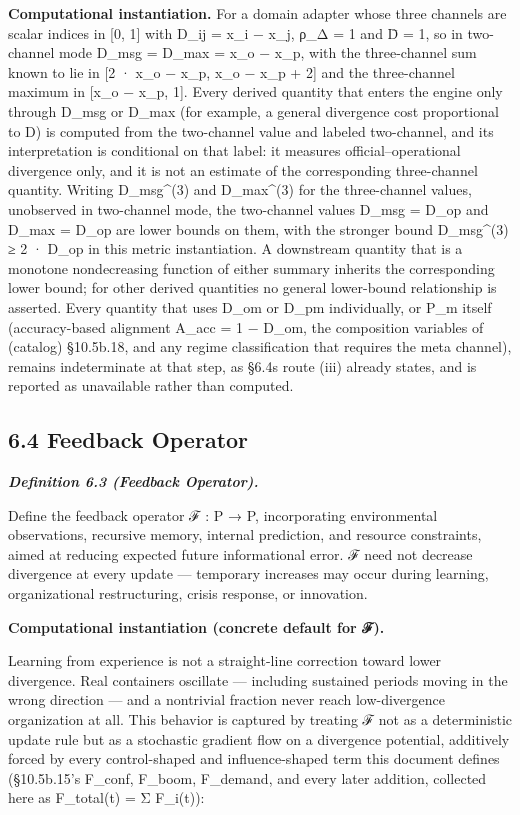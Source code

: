 \documentclass[
]{article}
\begin{document}
\textbf{Computational instantiation.} For a domain adapter whose three
channels are scalar indices in {[}0, 1{]} with D\_ij = \textbar x\_i −
x\_j\textbar, ρ\_Δ = 1 and D̄ = 1, so in two-channel mode D\_msg = D\_max
= \textbar x\_o − x\_p\textbar, with the three-channel sum known to lie
in {[}2 · \textbar x\_o − x\_p\textbar, \textbar x\_o − x\_p\textbar{} +
2{]} and the three-channel maximum in {[}\textbar x\_o − x\_p\textbar,
1{]}. Every derived quantity that enters the engine only through D\_msg
or D\_max (for example, a general divergence cost proportional to D) is
computed from the two-channel value and labeled two-channel, and its
interpretation is conditional on that label: it measures
official--operational divergence only, and it is not an estimate of the
corresponding three-channel quantity. Writing D\_msg\^{}(3) and
D\_max\^{}(3) for the three-channel values, unobserved in two-channel
mode, the two-channel values D\_msg = D\_op and D\_max = D\_op are lower
bounds on them, with the stronger bound D\_msg\^{}(3) ≥ 2 · D\_op in
this metric instantiation. A downstream quantity that is a monotone
nondecreasing function of either summary inherits the corresponding
lower bound; for other derived quantities no general lower-bound
relationship is asserted. Every quantity that uses D\_om or D\_pm
individually, or P\_m itself (accuracy-based alignment A\_acc = 1 −
D\_om, the composition variables of (catalog) §10.5b.18, and any regime
classification that requires the meta channel), remains indeterminate at
that step, as §6.4\textquotesingle s route (iii) already states, and is
reported as unavailable rather than computed.

\hypertarget{feedback-operator}{%
\subsection{6.4 Feedback Operator}\label{feedback-operator}}

\emph{\textbf{Definition 6.3 (Feedback Operator).}}

Define the feedback operator ℱ : P → P, incorporating environmental
observations, recursive memory, internal prediction, and resource
constraints, aimed at reducing expected future informational error. ℱ
need not decrease divergence at every update --- temporary increases may
occur during learning, organizational restructuring, crisis response, or
innovation.

\textbf{Computational instantiation (concrete default for ℱ).}

Learning from experience is not a straight-line correction toward lower
divergence. Real containers oscillate --- including sustained periods
moving in the wrong direction --- and a nontrivial fraction never reach
low-divergence organization at all. This behavior is captured by
treating ℱ not as a deterministic update rule but as a stochastic
gradient flow on a divergence potential, additively forced by every
control-shaped and influence-shaped term this document defines
(§10.5b.15's F\_conf, F\_boom, F\_demand, and every later addition,
collected here as F\_total(t) = Σ F\_i(t)):
\end{document}
